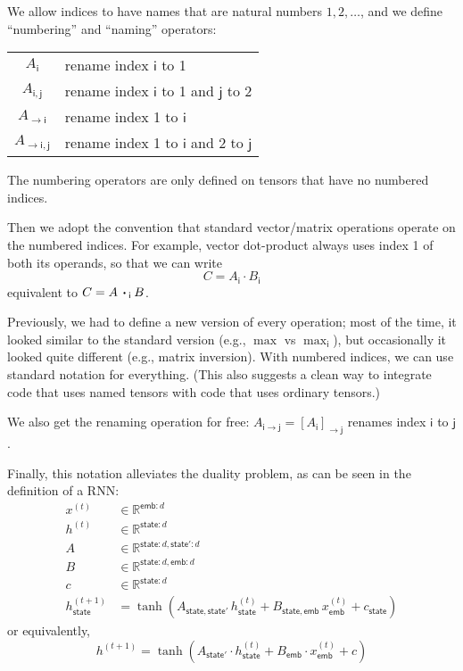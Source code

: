 \documentclass{article}
\newcommand{\name}[1]{\mathsf{#1}}
\newcommand{\ndot}[1]{\mathbin{\mathop{\thinspace\boldsymbol\cdot\thinspace}\displaylimits_{\name{#1}}}}
\begin{document}
We allow indices to have names that are natural numbers $1, 2, \ldots$, and we define ``numbering'' and ``naming'' operators:
\begin{center}
\begin{tabular}{cl}
$A_{\name{i}}$ & rename index $\name{i}$ to 1 \\
$A_{\name{i},\name{j}}$ & rename index $\name{i}$ to 1 and $\name{j}$ to 2 \\
$A_{\rightarrow\name{i}}$ & rename index 1 to $\name{i}$ \\
$A_{\rightarrow\name{i},\name{j}}$ & rename index 1 to $\name{i}$ and 2 to $\name{j}$
\end{tabular}
\end{center}
The numbering operators are only defined on tensors that have no numbered indices.

Then we adopt the convention that standard vector/matrix operations operate on the numbered indices. For example, vector dot-product always uses index 1 of both its operands, so that we can write
\begin{equation*}
C = A_{\name{i}} \cdot B_{\name{i}}
\end{equation*}
equivalent to $C = A \ndot{i} B$. 

Previously, we had to define a new version of every operation; most of the time, it looked similar to the standard version (e.g., $\max$ vs $\max_{\name{i}}$), but occasionally it looked quite different (e.g., matrix inversion). With numbered indices, we can use standard notation for everything.
(This also suggests a clean way to integrate code that uses named tensors with code that uses ordinary tensors.)

We also get the renaming operation for free: $A_{\name{i}\rightarrow\name{j}} = [A_{\name{i}}]_{\rightarrow\name{j}}$ renames index $\name{i}$ to $\name{j}$.

Finally, this notation alleviates the duality problem, as can be seen in the definition of a RNN:
\begin{align*}
x^{(t)} &\in \mathbb{R}^{\name{emb}: d} \\
h^{(t)} &\in \mathbb{R}^{\name{state}: d} \\
A &\in \mathbb{R}^{\name{state}: d, \name{state'}: d} \\
B &\in \mathbb{R}^{\name{state}: d, \name{emb}: d} \\
c &\in \mathbb{R}^{\name{state}: d} \\
h^{(t+1)}_{\name{state}} &= \tanh\left( A_{\name{state},\name{state'}} \, h^{(t)}_{\name{state}} + B_{\name{state},\name{emb}} \, x^{(t)}_{\name{emb}} + c_{\name{state}} \right)
\end{align*}
or equivalently,
\begin{equation*}
h^{(t+1)} = \tanh\left( A_{\name{state'}} \cdot h^{(t)}_{\name{state}} + B_{\name{emb}} \cdot x^{(t)}_{\name{emb}} + c \right)
\end{equation*}
\end{document}
